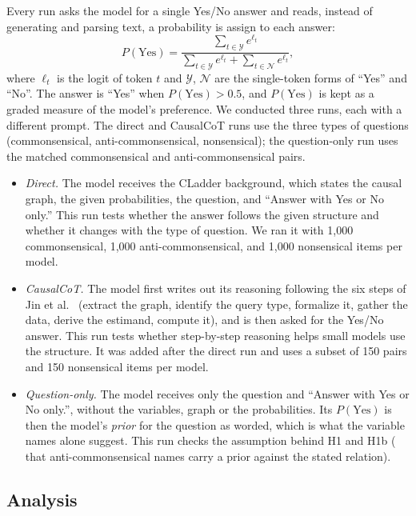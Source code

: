 \documentclass{llncs}
\begin{document}
Every run asks the model for a single Yes/No answer and reads, instead of generating and parsing text, a  probability is assign to each answer:
\[
P(\text{Yes}) = \frac{\sum_{t \in \mathcal{Y}} e^{\ell_t}}{\sum_{t \in \mathcal{Y}} e^{\ell_t} + \sum_{t \in \mathcal{N}} e^{\ell_t}},
\]
where $\ell_t$ is the logit of token $t$ and $\mathcal{Y}$, $\mathcal{N}$ are the single-token forms of ``Yes'' and ``No''. The answer is ``Yes'' when $P(\text{Yes}) > 0.5$, and $P(\text{Yes})$ is kept as a graded measure of the model's preference. We conducted three runs, each with a different prompt. The direct and CausalCoT runs use the three types of questions (commonsensical, anti-commonsensical, nonsensical); the question-only run uses the matched commonsensical and anti-commonsensical pairs.

\begin{itemize}
  \item \emph{Direct.} The model receives the CLadder background, which states the causal graph, the given probabilities, the question, and ``Answer with Yes or No only.'' This run tests whether the answer follows the given structure and whether it changes with the type of question. We ran it with 1,000 commonsensical, 1,000 anti-commonsensical, and 1,000 nonsensical items per model.
  \\
  \item \emph{CausalCoT.} The model first writes out its reasoning following the six steps of Jin et al.\ \cite{jin2023cladder} (extract the graph, identify the query type, formalize it, gather the data, derive the estimand, compute it), and is then asked for the Yes/No answer. This run tests whether step-by-step reasoning helps small models use the structure. It was added after the direct run and uses a subset of 150 pairs and 150 nonsensical items per model.
  \\
  \item \emph{Question-only.} The model receives only the question and ``Answer with Yes or No only.'', without the variables, graph or the probabilities. Its $P(\text{Yes})$ is then the model's \emph{prior} for the question as worded, which is what the variable names alone suggest. This run checks the assumption behind H1 and H1b ( that anti-commonsensical names carry a prior against the stated relation).
\end{itemize}
\subsection{Analysis}
\label{sec:analysis}
\end{document}
